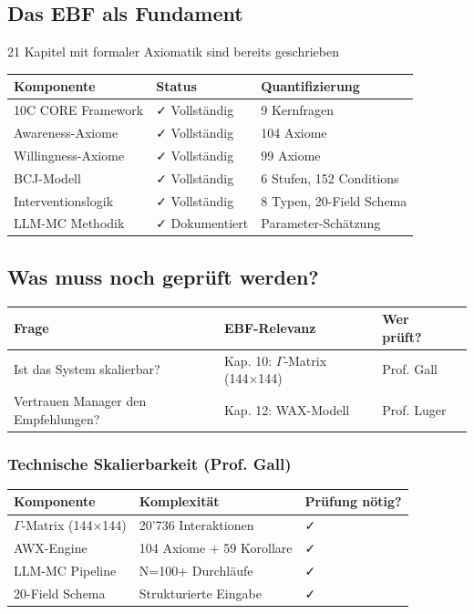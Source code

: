 \documentclass[11pt,a4paper]{article}
\begin{document}
\subsection{Das EBF als Fundament}

\begin{ebfbox}
21 Kapitel mit formaler Axiomatik sind bereits geschrieben
\end{ebfbox}

\begin{center}
\begin{tabular}{lll}
\toprule
\textbf{Komponente} & \textbf{Status} & \textbf{Quantifizierung} \\
\midrule
10C CORE Framework & ✓ Vollständig & 9 Kernfragen \\
Awareness-Axiome & ✓ Vollständig & 104 Axiome \\
Willingness-Axiome & ✓ Vollständig & 99 Axiome \\
BCJ-Modell & ✓ Vollständig & 6 Stufen, 152 Conditions \\
Interventionslogik & ✓ Vollständig & 8 Typen, 20-Field Schema \\
LLM-MC Methodik & ✓ Dokumentiert & Parameter-Schätzung \\
\bottomrule
\end{tabular}
\end{center}

\subsection{Was muss noch geprüft werden?}

\begin{center}
\begin{tabular}{llll}
\toprule
\textbf{Frage} & \textbf{EBF-Relevanz} & \textbf{Wer prüft?} \\
\midrule
Ist das System skalierbar? & Kap. 10: $\Gamma$-Matrix (144×144) & Prof. Gall \\
Vertrauen Manager den Empfehlungen? & Kap. 12: WAX-Modell & Prof. Luger \\
\bottomrule
\end{tabular}
\end{center}

\subsubsection{Technische Skalierbarkeit (Prof. Gall)}

\begin{center}
\begin{tabular}{lll}
\toprule
\textbf{Komponente} & \textbf{Komplexität} & \textbf{Prüfung nötig?} \\
\midrule
$\Gamma$-Matrix (144×144) & 20'736 Interaktionen & ✓ \\
AWX-Engine & 104 Axiome + 59 Korollare & ✓ \\
LLM-MC Pipeline & N=100+ Durchläufe & ✓ \\
20-Field Schema & Strukturierte Eingabe & ✓ \\
\bottomrule
\end{tabular}
\end{center}
\end{document}
